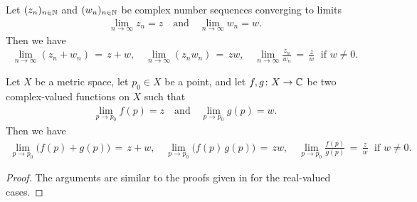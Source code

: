 \begin{lemma}
  \label{lem:complex_limit_properties}
  Let $(z_n)_{n \in \mathbb{N}}$ and $(w_n)_{n \in \mathbb{N}}$
  be complex number sequences converging to limits
  \begin{align*}
    \lim_{n \to \infty} z_n = z
    \quad \text{and} \quad
    \lim_{n \to \infty} w_n = w .
  \end{align*}
  Then we have
  \begin{align*}
    \lim_{n \to \infty} (z_n + w_n) \, = \, z + w ,
    \quad
    \lim_{n \to \infty} (z_n w_n) \, = \, z w ,
    \quad
    \lim_{n \to \infty} \frac{z_n}{w_n} \, = \, \frac{z}{w}
    \; \text{ if $w \ne 0$}.
  \end{align*}

  Let $X$ be a metric space, let $p_0 \in X$
  be a point, and let $f,g \colon X \to \mathbb{C}$
  be two complex-valued functions on $X$ such that
  \begin{align*}
    \lim_{p \to p_0} f(p) = z
    \quad \text{and} \quad
    \lim_{p \to p_0} g(p) = w .
  \end{align*}
  Then we have
  \begin{align*}
    \lim_{p \to p_0} \big( f(p) + g(p) \big) \, = \, z + w ,
    \quad
    \lim_{p \to p_0} \big( f(p) \, g(p) \big) \, = \, z w ,
    \quad
    \lim_{p \to p_0} \frac{f(p)}{g(p)} \, = \, \frac{z}{w}
    \; \text{ if $w \ne 0$}.
  \end{align*}
\end{lemma}
\begin{proof}
  The arguments are similar to the proofs given in
  \MetSpCourse{} for the real-valued cases.
\end{proof}

